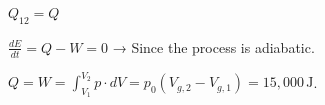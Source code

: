 \( Q_{12} = Q \)  

\( \frac{dE}{dt} = Q - W = 0 \) → Since the process is adiabatic.  

\( Q = W = \int_{V_1}^{V_2} p \cdot dV = p_0 (V_{g,2} - V_{g,1}) = 15,000 \, \text{J} \).
